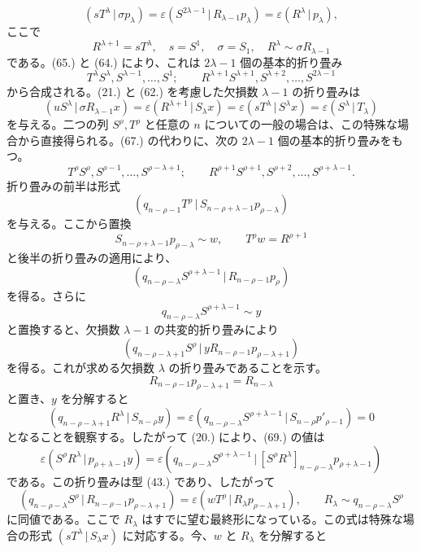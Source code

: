 \documentclass[11pt]{article}
\newcommand{\pair}[2]{(#1\,|\,#2)}
\newcommand{\eps}{\varepsilon}
\begin{document}
\[
 \pair{sT^\lambda}{\sigma p_\lambda}=\eps\pair{S^{2\lambda-1}}{R_{\lambda-1}p_\lambda}=\eps\pair{R^\lambda}{p_\lambda},
\]
ここで
\[
 R^{\lambda+1}=sT^\lambda,
 \quad s=S^1,
 \quad \sigma=S_1,
 \quad R^\lambda\sim\sigma R_{\lambda-1}
\]
である。(65.) と (64.) により、これは $2\lambda-1$ 個の基本的折り畳み
\begin{equation}
 T^\lambda S^\lambda,S^{\lambda-1},\ldots,S^1;
 \qquad R^{\lambda+1}S^{\lambda+1},S^{\lambda+2},\ldots,S^{2\lambda-1}
\tag{67}
\end{equation}
から合成される。(21.) と (62.) を考慮した欠損数 $\lambda-1$ の折り畳みは
\[
 \pair{uS^\lambda}{\sigma R_{\lambda-1}x}=\eps\pair{R^{\lambda+1}}{S_\lambda x}
 =\eps\pair{sT^\lambda}{S^\lambda x}=\eps\pair{S^\lambda}{T_\lambda}
\]
を与える。二つの列 $S^\rho,T^\rho$ と任意の $n$ についての一般の場合は、この特殊な場合から直接得られる。(67.) の代わりに、次の $2\lambda-1$ 個の基本的折り畳みをもつ。
\begin{equation}
 T^\rho S^\rho,S^{\rho-1},\ldots,S^{\rho-\lambda+1};
 \qquad R^{\rho+1}S^{\rho+1},S^{\rho+2},\ldots,S^{\rho+\lambda-1}.
\tag{68}
\end{equation}
折り畳みの前半は形式
\[
 \pair{q_{n-\rho-1}T^\rho}{S_{n-\rho+\lambda-1}p_{\rho-\lambda}}
\]
を与える。ここから置換
\[
 S_{n-\rho+\lambda-1}p_{\rho-\lambda}\sim w,
 \qquad T^\rho w=R^{\rho+1}
\]
と後半の折り畳みの適用により、
\[
 \pair{q_{n-\rho-\lambda}S^{\rho+\lambda-1}}{R_{n-\rho-1}p_\rho}
\]
を得る。さらに
\[
 q_{n-\rho-\lambda}S^{\rho+\lambda-1}\sim y
\]
と置換すると、欠損数 $\lambda-1$ の共変的折り畳みにより
\begin{equation}
 \pair{q_{n-\rho-\lambda+1}S^\rho}{yR_{n-\rho-1}p_{\rho-\lambda+1}}
\tag{69}
\end{equation}
を得る。これが求める欠損数 $\lambda$ の折り畳みであることを示す。
\[
 R_{n-\rho-1}p_{\rho-\lambda+1}=R_{n-\lambda}
\]
と置き、$y$ を分解すると
\[
 \pair{q_{n-\rho-\lambda+1}R^\lambda}{S_{n-\rho}y}
 =\eps\pair{q_{n-\rho-\lambda}S^{\rho+\lambda-1}}{S_{n-\rho}p'_{\rho-1}}=0
\]
となることを観察する。したがって (20.) により、(69.) の値は
\[
 \eps\pair{S^\rho R^\lambda}{p_{\rho+\lambda-1}y}
 =\eps\pair{q_{n-\rho-\lambda}S^{\rho+\lambda-1}}{[S^\rho R^\lambda]_{n-\rho-\lambda}p_{\rho+\lambda-1}}
\]
である。この折り畳みは型 (43.) であり、したがって
\[
 \pair{q_{n-\rho-\lambda}S^\rho}{R_{n-\rho-1}p_{\rho-\lambda+1}}
 =\eps\pair{wT^\rho}{R_\lambda p_{\rho-\lambda+1}},
 \qquad R_\lambda\sim q_{n-\rho-\lambda}S^\rho
\]
に同値である。ここで $R_\lambda$ はすでに望む最終形になっている。この式は特殊な場合の形式 $\pair{sT^\lambda}{S_\lambda x}$ に対応する。今、$w$ と $R_\lambda$ を分解すると
\end{document}
